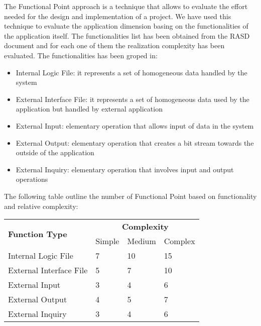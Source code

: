 The Functional Point approach is a technique that allows to evaluate the effort
needed for the design and implementation of a project. We have used this technique
to evaluate the application dimension basing on the functionalities of the
application itself. The functionalities list has been obtained from the RASD document
and for each one of them the realization complexity has been evaluated.
The functionalities has been groped in:
\begin{itemize}
\item Internal Logic File: it represents a set of homogeneous data handled by the system
\item External Interface File: it represents a set of homogeneous data used
by the application but handled by external application
\item External Input: elementary operation that allows input of data in the system
\item External Output: elementary operation that creates a bit stream towards
the outside of the application
\item External Inquiry: elementary operation that involves input and output operations
\end{itemize}

\newpage

The following table outline the number of Functional Point based on functionality
and relative complexity:

\begin{table}[h]
	\centering
	\begin{tabular}{| l | l | l | l |}
		\hline
		\multirow{2}{*}{\textbf{Function Type}} & \multicolumn{3}{c|}{\textbf{Complexity}} \\
		\cline{2-4}
		& Simple & Medium & Complex  \\
		\hline
		Internal Logic File & 7 & 10 & 15 \\ \hline
		External Interface File & 5 & 7 & 10 \\ \hline
		External Input & 3 & 4 & 6 \\ \hline
		External Output & 4 & 5 & 7 \\ \hline
		External Inquiry & 3 & 4 & 6 \\ \hline

	\end{tabular}
\end{table}



